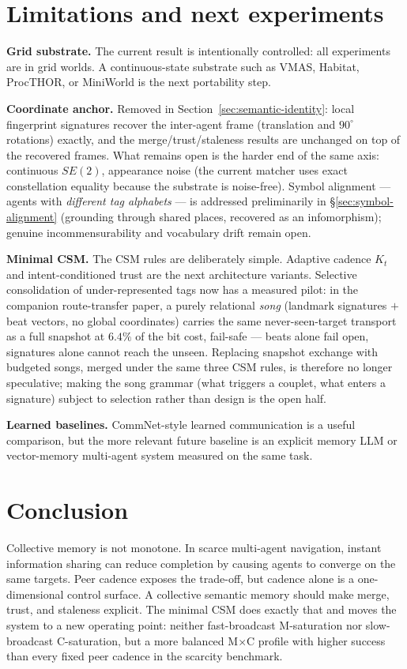 \documentclass{article}
\begin{document}
\section{Limitations and next experiments}
\label{sec:limitations}

\textbf{Grid substrate.} The current result is intentionally controlled:
all experiments are in grid worlds. A continuous-state substrate such
as VMAS, Habitat, ProcTHOR, or MiniWorld is the next portability step.

\textbf{Coordinate anchor.} Removed in
Section~\ref{sec:semantic-identity}: local fingerprint signatures
recover the inter-agent frame (translation and $90^\circ$ rotations)
exactly, and the merge/trust/staleness results are unchanged on top of
the recovered frames. What remains open is the harder end of the same
axis: continuous $SE(2)$, appearance noise (the current matcher uses
exact constellation equality because the substrate is noise-free). Symbol
alignment --- agents with \emph{different tag alphabets} --- is addressed
preliminarily in \S\ref{sec:symbol-alignment} (grounding through shared places,
recovered as an infomorphism); genuine incommensurability and vocabulary drift
remain open.

\textbf{Minimal CSM.} The CSM rules are deliberately simple. Adaptive
cadence $K_t$ and intent-conditioned trust are the next architecture
variants. Selective consolidation of under-represented tags now has a
measured pilot: in the companion route-transfer paper, a purely
relational \emph{song} (landmark signatures $+$ beat vectors, no
global coordinates) carries the same never-seen-target transport as a
full snapshot at $6.4\%$ of the bit cost, fail-safe --- beats alone
fail open, signatures alone cannot reach the unseen. Replacing
snapshot exchange with budgeted songs, merged under the same three
CSM rules, is therefore no longer speculative; making the song
grammar (what triggers a couplet, what enters a signature) subject to
selection rather than design is the open half.

\textbf{Learned baselines.} CommNet-style learned communication is a
useful comparison, but the more relevant future baseline is an explicit
memory LLM or vector-memory multi-agent system measured on the same
task.

\section{Conclusion}

Collective memory is not monotone. In scarce multi-agent navigation,
instant information sharing can reduce completion by causing agents to
converge on the same targets. Peer cadence exposes the trade-off, but
cadence alone is a one-dimensional control surface. A collective
semantic memory should make merge, trust, and staleness explicit. The
minimal CSM does exactly that and moves the system to a new operating
point: neither fast-broadcast M-saturation nor slow-broadcast
C-saturation, but a more balanced M$\times$C profile with higher
success than every fixed peer cadence in the scarcity benchmark.
\end{document}
